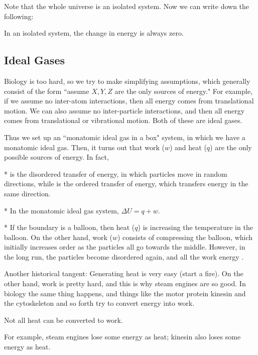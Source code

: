 Note that the whole universe is an isolated system. Now we can write down the following:

\begin{law}
	In an isolated system, the change in energy is always zero.
\end{law}

\subsection{Ideal Gases}

Biology is too hard, so we try to make simplifying assumptions, which generally consist of the form ``assume $X,Y,Z$ are the only sources of energy." For example, if we assume no inter-atom interactions, then all energy comes from translational motion. We can also assume no inter-particle interactions, and then all energy comes from translational or vibrational motion. Both of these are ideal gases.

Thus we set up an ``monatomic ideal gas in a box" system, in which we have a monatomic ideal gas. Then, it turns out that work ($w$) and heat ($q$) are the only possible sources of energy. In fact, 

\begin{defn}*
	 is the disordered transfer of energy, in which particles move in random directions, while  is the ordered transfer of energy, which transfers energy in the same direction.
\end{defn} 

\begin{fact}*
	In the monatomic ideal gas system, $\Delta U = q + w$.
\end{fact}

\begin{exm}*
	If the boundary is a balloon, then heat ($q$) is increasing the temperature in the balloon. On the other hand, work ($w$) consists of compressing the balloon, which initially increases order as the particles all go towards the middle. However, in the long run, the particles become disordered again, and all the work energy .
\end{exm}

Another historical tangent: Generating heat is very easy (start a fire). On the other hand, work is pretty hard, and this is why steam engines are so good. In biology the same thing happens, and things like the motor protein kinesin and the cytoskeleton and so forth try to convert energy into work.

\begin{fact}
	Not all heat can be converted to work.
\end{fact}

For example, steam engines lose some energy as heat; kinesin also loses some energy as heat.
